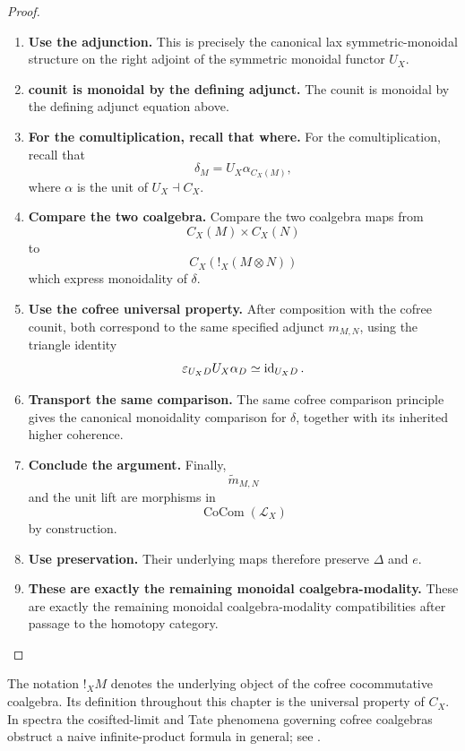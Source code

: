 \begin{proof}
\begin{enumerate}[label=\textup{(\arabic*)}]
    \item \textbf{Use the adjunction.}
    This is precisely the canonical lax symmetric-monoidal structure on the right adjoint of the
    symmetric monoidal functor \(U_X\).

    \item \textbf{counit is monoidal by the defining adjunct.}
    The counit is monoidal by the defining adjunct equation above.

    \item \textbf{For the comultiplication, recall that where.}
    For the comultiplication, recall that
    \[
        \delta_M
        =
        U_X\alpha_{C_X(M)},
    \]
    where \(\alpha\) is the unit of \(U_X\dashv C_X\).

    \item \textbf{Compare the two coalgebra.}
    Compare the two coalgebra maps from
    \[
        C_X(M)\times C_X(N)
    \]
    to
    \[
        C_X(!_X(M\otimes N))
    \]
    which express monoidality of \(\delta\).

    \item \textbf{Use the cofree universal property.}
    After composition with the cofree counit, both correspond to the same specified adjunct
    \(m_{M,N}\), using the triangle identity
    \[
        \varepsilon_{U_XD}U_X\alpha_D
        \simeq
        \operatorname{id}_{U_XD}.
    \]

    \item \textbf{Transport the same comparison.}
    The same cofree comparison principle gives the canonical monoidality comparison for
    \(\delta\), together with its inherited higher coherence.

    \item \textbf{Conclude the argument.}
    Finally,
    \[
        \widetilde m_{M,N}
    \]
    and the unit lift are morphisms in
    \[
        \operatorname{CoCom}(\mathcal L_X)
    \]
    by construction.

    \item \textbf{Use preservation.}
    Their underlying maps therefore preserve \(\Delta\) and \(e\).

    \item \textbf{These are exactly the remaining monoidal coalgebra-modality.}
    These are exactly the remaining monoidal coalgebra-modality compatibilities after passage to
    the homotopy category.
\end{enumerate}
\end{proof}

\begin{remark}
\label{rem:no-naive-cofree-symmetric-power-formula}
The notation \(!_XM\) denotes the underlying object of the cofree
cocommutative coalgebra. Its definition throughout this chapter is the
universal property of \(C_X\). In spectra the cosifted-limit and Tate
phenomena governing cofree coalgebras obstruct a naive infinite-product
formula in general; see \cite{BachmannBurklund2026Coalgebras}.
\end{remark}


